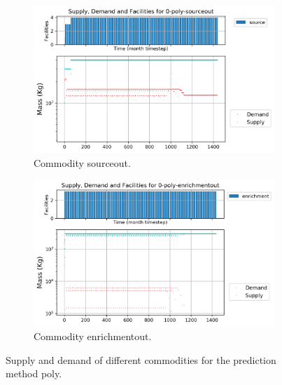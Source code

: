 \documentclass[11pt]{article}
\begin{document}
\begin{figure}[H]
	\centering
	\begin{subfigure}[]{0.45\textwidth}
		\centering
		\includegraphics[width=\linewidth]{23-figures/0-poly-sourceout.png} 
		\caption{Commodity sourceout.}
		\label{fig:23-sourceout}
	\end{subfigure}
	\vspace{1cm}
	\begin{subfigure}[]{0.45\textwidth}
		\centering
		\includegraphics[width=\linewidth]{23-figures/0-poly-enrichmentout.png} 
		\caption{Commodity enrichmentout.}
		\label{fig:23-enrichmentout}
	\end{subfigure}
	\hfill
	\caption{Supply and demand of different commodities for the prediction method poly.}
	\label{fig:23-front}
\end{figure}
\end{document}
